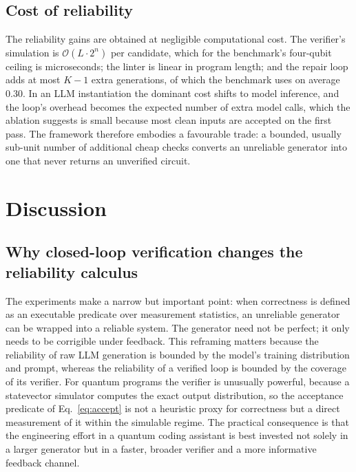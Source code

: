 \documentclass[11pt,a4paper]{article}
\begin{document}
\subsection{Cost of reliability}
The reliability gains are obtained at negligible computational cost. The verifier's simulation is $\mathcal{O}(L\cdot 2^{n})$ per candidate, which for the benchmark's four-qubit ceiling is microseconds; the linter is linear in program length; and the repair loop adds at most $K-1$ extra generations, of which the benchmark uses on average $0.30$. In an LLM instantiation the dominant cost shifts to model inference, and the loop's overhead becomes the expected number of extra model calls, which the ablation suggests is small because most clean inputs are accepted on the first pass. The framework therefore embodies a favourable trade: a bounded, usually sub-unit number of additional cheap checks converts an unreliable generator into one that never returns an unverified circuit.

\section{Discussion}
\label{sec:discussion}

\subsection{Why closed-loop verification changes the reliability calculus}
The experiments make a narrow but important point: when correctness is defined as an executable predicate over measurement statistics, an unreliable generator can be wrapped into a reliable system. The generator need not be perfect; it only needs to be corrigible under feedback. This reframing matters because the reliability of raw LLM generation is bounded by the model's training distribution and prompt, whereas the reliability of a verified loop is bounded by the coverage of its verifier. For quantum programs the verifier is unusually powerful, because a statevector simulator computes the exact output distribution, so the acceptance predicate of Eq.~\eqref{eq:accept} is not a heuristic proxy for correctness but a direct measurement of it within the simulable regime. The practical consequence is that the engineering effort in a quantum coding assistant is best invested not solely in a larger generator but in a faster, broader verifier and a more informative feedback channel.
\end{document}

